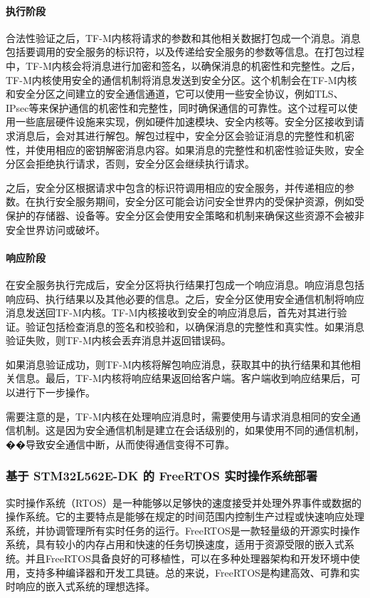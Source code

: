 \documentclass[12pt,a4paper]{ctexart}
\numberwithin{figure}{section}
\begin{document}
\paragraph{执行阶段}
\par 合法性验证之后，TF-M内核将请求的参数和其他相关数据打包成一个消息。消息包括要调用的安全服务的标识符，以及传递给安全服务的参数等信息。在打包过程中，TF-M内核会将消息进行加密和签名，以确保消息的机密性和完整性。之后，TF-M内核使用安全的通信机制将消息发送到安全分区。这个机制会在TF-M内核和安全分区之间建立的安全通信通道，它可以使用一些安全协议，例如TLS、IPsec等来保护通信的机密性和完整性，同时确保通信的可靠性。这个过程可以使用一些底层硬件设施来实现，例如硬件加速模块、安全内核等。安全分区接收到请求消息后，会对其进行解包。解包过程中，安全分区会验证消息的完整性和机密性，并使用相应的密钥解密消息内容。如果消息的完整性和机密性验证失败，安全分区会拒绝执行请求，否则，安全分区会继续执行请求。
\par 之后，安全分区根据请求中包含的标识符调用相应的安全服务，并传递相应的参数。在执行安全服务期间，安全分区可能会访问安全世界内的受保护资源，例如受保护的存储器、设备等。安全分区会使用安全策略和机制来确保这些资源不会被非安全世界访问或破坏。
\paragraph{响应阶段}
\par 在安全服务执行完成后，安全分区将执行结果打包成一个响应消息。响应消息包括响应码、执行结果以及其他必要的信息。之后，安全分区使用安全通信机制将响应消息发送回TF-M内核。TF-M内核接收到安全的响应消息后，首先对其进行验证。验证包括检查消息的签名和校验和，以确保消息的完整性和真实性。如果消息验证失败，则TF-M内核会丢弃消息并返回错误码。
\par 如果消息验证成功，则TF-M内核将解包响应消息，获取其中的执行结果和其他相关信息。最后，TF-M内核将响应结果返回给客户端。客户端收到响应结果后，可以进行下一步操作。
\par 需要注意的是，TF-M内核在处理响应消息时，需要使用与请求消息相同的安全通信机制。这是因为安全通信机制是建立在会话级别的，如果使用不同的通信机制，��导致安全通信中断，从而使得通信变得不可靠。

\subsubsection{基于 STM32L562E-DK 的 FreeRTOS 实时操作系统部署}
\par 实时操作系统（RTOS）是一种能够以足够快的速度接受并处理外界事件或数据的操作系统。它的主要特点是能够在规定的时间范围内控制生产过程或快速响应处理系统，并协调管理所有实时任务的运行。FreeRTOS是一款轻量级的开源实时操作系统，具有较小的内存占用和快速的任务切换速度，适用于资源受限的嵌入式系统。并且FreeRTOS具备良好的可移植性，可以在多种处理器架构和开发环境中使用，支持多种编译器和开发工具链。总的来说，FreeRTOS是构建高效、可靠和实时响应的嵌入式系统的理想选择。
\end{document}
